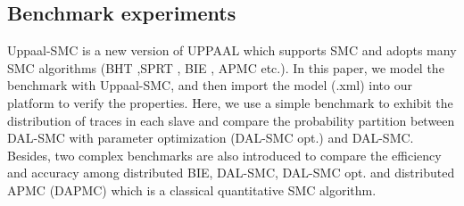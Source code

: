 \subsection{Benchmark experiments}
Uppaal-SMC \cite{Bulychev2012UPPAAL} is a new version of UPPAAL which supports SMC and adopts many SMC algorithms (BHT \cite{jha2009bayesian},SPRT \cite{younes2006statistical}, BIE \cite{zuliani2013bayesian}, APMC \cite{herault2004approximate} etc.). In this paper, we model the benchmark with Uppaal-SMC, and then import the model (.xml) into our platform to verify the properties. Here, we use a simple benchmark to exhibit the distribution of traces in each slave and compare the probability partition between DAL-SMC with parameter optimization (DAL-SMC opt.) and DAL-SMC. Besides, two complex benchmarks are also introduced to compare the efficiency and accuracy among distributed BIE, DAL-SMC, DAL-SMC opt. and distributed APMC (DAPMC) which is a classical quantitative SMC algorithm.
